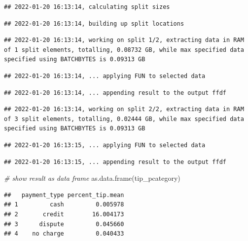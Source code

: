 \documentclass[
  12pt,
]{style/krantz}
\newenvironment{Shaded}{\begin{snugshade}}{\end{snugshade}}
\newcommand{\CommentTok}[1]{\textcolor[rgb]{0.56,0.35,0.01}{\textit{#1}}}
\newcommand{\FunctionTok}[1]{\textcolor[rgb]{0.00,0.00,0.00}{#1}}
\newcommand{\NormalTok}[1]{#1}
\begin{document}
\begin{verbatim}
## 2022-01-20 16:13:14, calculating split sizes
\end{verbatim}

\begin{verbatim}
## 2022-01-20 16:13:14, building up split locations
\end{verbatim}

\begin{verbatim}
## 2022-01-20 16:13:14, working on split 1/2, extracting data in RAM of 1 split elements, totalling, 0.08732 GB, while max specified data specified using BATCHBYTES is 0.09313 GB
\end{verbatim}

\begin{verbatim}
## 2022-01-20 16:13:14, ... applying FUN to selected data
\end{verbatim}

\begin{verbatim}
## 2022-01-20 16:13:14, ... appending result to the output ffdf
\end{verbatim}

\begin{verbatim}
## 2022-01-20 16:13:14, working on split 2/2, extracting data in RAM of 3 split elements, totalling, 0.02444 GB, while max specified data specified using BATCHBYTES is 0.09313 GB
\end{verbatim}

\begin{verbatim}
## 2022-01-20 16:13:15, ... applying FUN to selected data
\end{verbatim}

\begin{verbatim}
## 2022-01-20 16:13:15, ... appending result to the output ffdf
\end{verbatim}

\begin{Shaded}
\begin{Highlighting}[]
\CommentTok{\# show result as data frame}
\FunctionTok{as.data.frame}\NormalTok{(tip\_pcategory)}
\end{Highlighting}
\end{Shaded}

\begin{verbatim}
##   payment_type percent_tip.mean
## 1         cash         0.005978
## 2       credit        16.004173
## 3      dispute         0.045660
## 4    no charge         0.040433
\end{verbatim}
\end{document}
